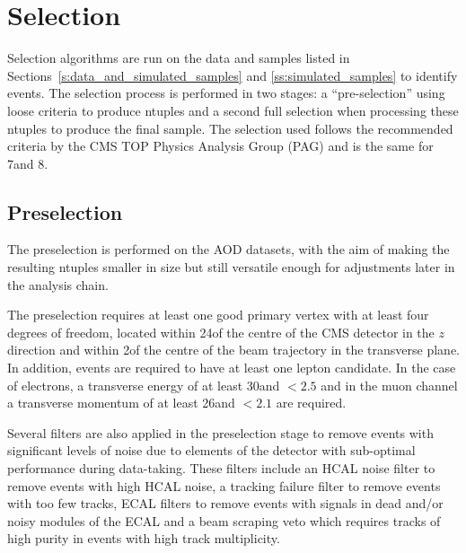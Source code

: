 \begin{landscape}


\end{landscape}

\FloatBarrier

\section{Selection}
\label{s:selection}
Selection algorithms are run on the data and samples listed in Sections~\ref{s:data_and_simulated_samples} and
\ref{ss:simulated_samples} to identify \ttbar events. The selection process is performed in two stages: a
``pre-selection'' using loose criteria to produce ntuples and a second full selection when processing these
ntuples to produce the final sample. The selection used follows the recommended criteria by the CMS TOP
Physics Analysis Group (PAG) and is the same for 7\TeV and 8\TeV.

\subsection{Preselection}
\label{ss:preselection}
The preselection is performed on the AOD datasets, with the aim of making the resulting ntuples smaller
in size but still versatile enough for adjustments later in the analysis chain.

The preselection requires at least one good primary vertex with at least four degrees of freedom, located
within 24\cm of the centre of the CMS detector in the $z$ direction and within 2\cm of the centre of the beam
trajectory in the transverse plane. In addition, events are required to have at least one lepton candidate. In
the case of electrons, a transverse energy of at least 30\GeV and \abseta$<2.5$ and in the muon channel a
transverse momentum of at least 26\GeV and \abseta$<2.1$ are required.

Several filters are also applied in the preselection stage to remove events with significant levels of noise
due to elements of the detector with sub-optimal performance during data-taking. These filters include an HCAL
noise filter to remove events with high HCAL noise, a tracking failure filter to remove events with too few
tracks, ECAL filters to remove events with signals in dead and/or noisy modules of the ECAL and a beam
scraping veto which requires tracks of high purity in events with high track multiplicity.

